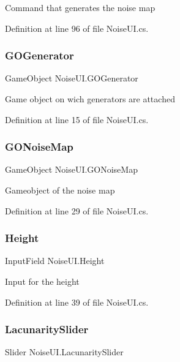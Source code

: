 Command that generates the noise map 



Definition at line 96 of file Noise\+U\+I.\+cs.

\mbox{\label{class_noise_u_i_a30227f652037d31ce3ce00644c123755}} 
\subsubsection{G\+O\+Generator}
{\footnotesize\ttfamily Game\+Object Noise\+U\+I.\+G\+O\+Generator}



Game object on wich generators are attached 



Definition at line 15 of file Noise\+U\+I.\+cs.

\mbox{\label{class_noise_u_i_a7f4e0d70356cdd4b8d693bf4ce744eec}} 
\subsubsection{G\+O\+Noise\+Map}
{\footnotesize\ttfamily Game\+Object Noise\+U\+I.\+G\+O\+Noise\+Map}



Gameobject of the noise map 



Definition at line 29 of file Noise\+U\+I.\+cs.

\mbox{\label{class_noise_u_i_a05f20c60434a126ca7f0fddb9dcdedbc}} 
\subsubsection{Height}
{\footnotesize\ttfamily Input\+Field Noise\+U\+I.\+Height}



Input for the height 



Definition at line 39 of file Noise\+U\+I.\+cs.

\mbox{\label{class_noise_u_i_afa855837267189e231ca257d49fc587c}} 
\subsubsection{Lacunarity\+Slider}
{\footnotesize\ttfamily Slider Noise\+U\+I.\+Lacunarity\+Slider}



